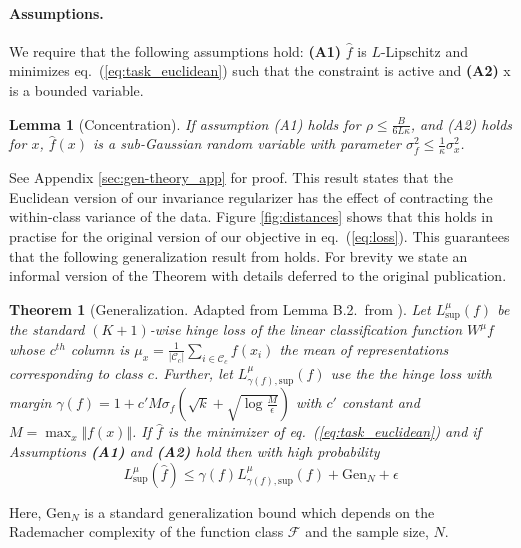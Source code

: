 \documentclass{article}
\def\eqref#1{eq.~(\ref{#1})}
\newcommand{\feat}{f}
\newtheorem{theorem}{Theorem}
\newtheorem{lemma}{Lemma}
\begin{document}
\paragraph{Assumptions.}\label{assn:concentration}
We require that the following assumptions hold:
    {\bf (A1)} $\hat{\feat}$ is $L$-Lipschitz and minimizes \eqref{eq:task_euclidean} such that the constraint is active and 
    {\bf (A2)} x is a bounded variable.

\begin{lemma}[Concentration\label{lem:concentration}]
If assumption (A1) holds for $\rho\leq \frac{B}{6L\kappa}$, and (A2) holds for $x$, $\hat{\feat}(x)$ is a sub-Gaussian random variable with parameter $\sigma^2_f \leq \frac{1}{\kappa} \sigma^2_x$.
\end{lemma}
See Appendix \ref{sec:gen-theory_app} for proof. This result states that the Euclidean version of our invariance regularizer has the effect of contracting the within-class variance of the data. Figure \ref{fig:distances} shows that this holds in practise for the original version of our objective in \eqref{eq:loss}. This guarantees that the following generalization result from \citep{saunshi2019theoretical} holds. For brevity we state an informal version of the Theorem with details deferred to the original publication. 

\begin{theorem}[Generalization. Adapted from Lemma B.2.\ from \citep{saunshi2019theoretical}]
Let 
$L^{\mu}_{\text{sup}}(\feat)$
be the standard $(K+1)$-wise hinge loss of the linear classification function $W^{\mu}f$ whose $c^{th}$ column is  $\mu_x = \frac{1}{|\mathcal{C}_c|} \sum_{i\in \mathcal{C}_c} \feat(x_i)$ the mean of representations corresponding to class $c$. Further, let $L^{\mu}_{\gamma(f), \text{sup}}(\feat)$ use the the hinge loss with margin $\gamma (f) = 1 + c' M \sigma_f (\sqrt{k} + \sqrt{\log \frac{M}{\epsilon}})$ with $c'$ constant and $M = \max_x \Vert f(x) \Vert$.
If $\hat{\feat}$ is the minimizer of \eqref{eq:task_euclidean} and if Assumptions \textbf{(A1)} and \textbf{(A2)} hold then with high probability
\begin{equation}
L^{\mu}_{\text{sup}}(\hat{f}) \leq \gamma(f) L^{\mu}_{\gamma(f), \text{sup}}(f) + \text{Gen}_N + \epsilon
\label{eqn:blah}
\end{equation}
\end{theorem}
Here, $\text{Gen}_N$ is a standard generalization bound which depends on the Rademacher complexity of the function class $\mathcal{F}$ and the sample size, $N$. 
\end{document}
